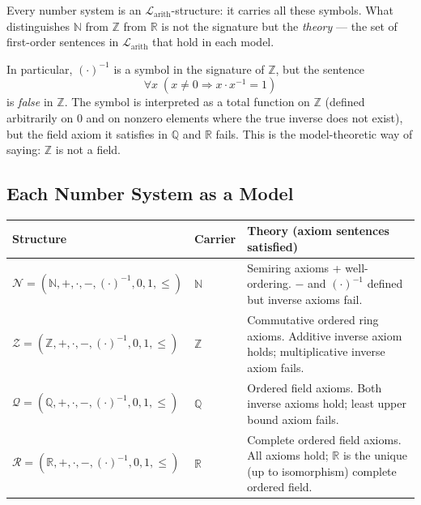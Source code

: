 \begin{remark}
Every number system is an $\mathcal{L}_{\mathrm{arith}}$-structure:
it carries all these symbols.
What distinguishes $\mathbb{N}$ from $\mathbb{Z}$ from $\mathbb{R}$
is not the signature but the \emph{theory} — the set of first-order
sentences in $\mathcal{L}_{\mathrm{arith}}$ that hold in each model.

In particular, $(\cdot)^{-1}$ is a symbol in the signature of
$\mathbb{Z}$, but the sentence
\[
\forall x\;(x \neq 0 \Rightarrow x \cdot x^{-1} = 1)
\]
is \emph{false} in $\mathbb{Z}$.
The symbol is interpreted as a total function on $\mathbb{Z}$
(defined arbitrarily on $0$ and on nonzero elements where the true
inverse does not exist), but the field axiom it satisfies in
$\mathbb{Q}$ and $\mathbb{R}$ fails.
This is the model-theoretic way of saying: $\mathbb{Z}$ is not a field.
\end{remark}

\subsection{Each Number System as a Model}

\begin{tcolorbox}[colback=gray!6, colframe=gray!40, arc=2pt,
  left=6pt, right=6pt, top=4pt, bottom=4pt,
  title={\small\textbf{Number Systems as Models of
         $\mathcal{L}_{\mathrm{arith}}$}},
  fonttitle=\small\bfseries]
\small
\renewcommand{\arraystretch}{1.35}
\begin{tabular}{@{} l l l @{}}
\toprule
\textbf{Structure} & \textbf{Carrier} & \textbf{Theory (axiom sentences satisfied)} \\
\midrule
$\mathcal{N} = (\mathbb{N}, +, \cdot, -, (\cdot)^{-1}, 0, 1, \leq)$
  & $\mathbb{N}$
  & Semiring axioms + well-ordering.
    $-$ and $(\cdot)^{-1}$ defined but inverse axioms fail. \\[4pt]
$\mathcal{Z} = (\mathbb{Z}, +, \cdot, -, (\cdot)^{-1}, 0, 1, \leq)$
  & $\mathbb{Z}$
  & Commutative ordered ring axioms.
    Additive inverse axiom holds; multiplicative inverse axiom fails. \\[4pt]
$\mathcal{Q} = (\mathbb{Q}, +, \cdot, -, (\cdot)^{-1}, 0, 1, \leq)$
  & $\mathbb{Q}$
  & Ordered field axioms.
    Both inverse axioms hold; least upper bound axiom fails. \\[4pt]
$\mathcal{R} = (\mathbb{R}, +, \cdot, -, (\cdot)^{-1}, 0, 1, \leq)$
  & $\mathbb{R}$
  & Complete ordered field axioms.
    All axioms hold; $\mathbb{R}$ is the unique (up to isomorphism)
    complete ordered field. \\
\bottomrule
\end{tabular}
\end{tcolorbox}

